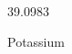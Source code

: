 \documentclass[12pt]{article}
\begin{document}
\hfill{}
\vfill
\begin{center}
  {\fontsize{50}{60}
  }

  \vspace{1em}

  39.0983

Potassium
\end{center}
\vfill
\end{document}
